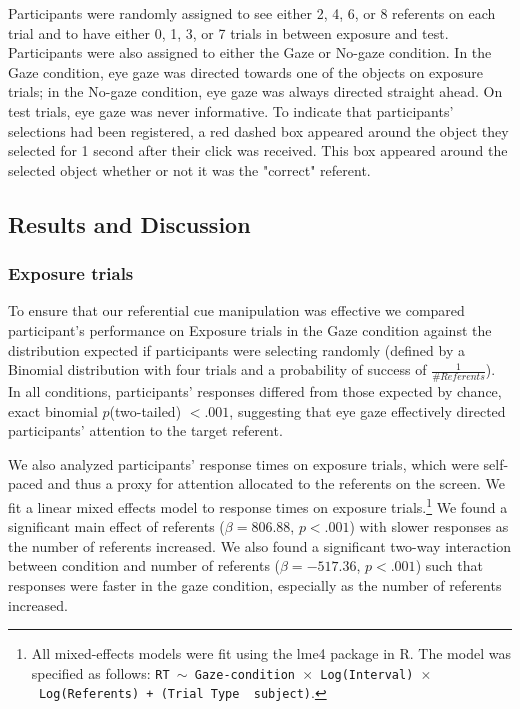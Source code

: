 \documentclass[10pt,letterpaper]{article}
\begin{document}
Participants were randomly assigned to see either 2, 4, 6, or 8 referents on each trial and to have either 0, 1, 3, or 7 trials in between exposure and test. Participants were also assigned to either the Gaze or No-gaze condition. In the Gaze condition, eye gaze was directed towards one of the objects on exposure trials; in the No-gaze condition, eye gaze was always directed straight ahead. On test trials, eye gaze was never informative. To indicate that participants' selections had been registered, a red dashed box appeared around the object they selected for 1 second after their click was received. This box appeared around the selected object whether or not it was the "correct" referent.

\subsection{Results and Discussion}

\subsubsection{Exposure trials}

To ensure that our referential cue manipulation was effective we compared participant's performance on Exposure trials in the Gaze condition against the distribution expected if participants were selecting randomly (defined by a Binomial distribution with four trials and a probability of success of $\frac{1}{\# Referents}$). In all conditions, participants' responses differed from those expected by chance, exact binomial  $p$(two-tailed) $< .001$, suggesting that eye gaze effectively directed participants' attention to the target referent. 

We also analyzed participants' response times on exposure trials, which were self-paced and thus a proxy for attention allocated to the referents on the screen. We fit a linear mixed effects  model to response times on exposure trials.\footnote{All mixed-effects models were fit using the lme4 package in R. The model was specified as follows: \texttt{RT $\sim$ Gaze-condition~$\times$~Log(Interval)~$\times$~Log(Referents) + (Trial Type \textbar~subject)}.} We found a significant main effect of referents ($\beta=  806.88$, $p< .001$) with slower responses as the number of referents increased. We also found a significant two-way interaction between condition and number of referents ($\beta=  -517.36$, $p< .001$) such that responses were faster in the gaze condition, especially as the number of referents increased.
\end{document}
